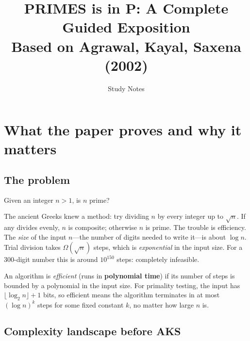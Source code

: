 \documentclass[12pt]{article}
\title{\textbf{PRIMES is in P: A Complete Guided Exposition}\\
  \large Based on Agrawal, Kayal, Saxena (2002)}
\author{Study Notes}
\date{}
\begin{document}
\maketitle
\tableofcontents
\newpage

\section{What the paper proves and why it matters}

\subsection{The problem}

Given an integer $n > 1$, is $n$ prime?

The ancient Greeks knew a method: try dividing $n$ by every integer up to $\sqrt{n}$. If any divides evenly, $n$ is composite; otherwise $n$ is prime. The trouble is efficiency. The \emph{size} of the input $n$---the number of digits needed to write it---is about $\log n$. Trial division takes $\Omega(\sqrt{n})$ steps, which is \emph{exponential} in the input size. For a 300-digit number this is around $10^{150}$ steps: completely infeasible.

\begin{defbox}
An algorithm is \emph{efficient} (runs in \textbf{polynomial time}) if its number of steps is bounded by a polynomial in the input size. For primality testing, the input has $\lfloor\log_2 n\rfloor + 1$ bits, so efficient means the algorithm terminates in at most $(\log n)^k$ steps for some fixed constant $k$, no matter how large $n$ is.
\end{defbox}

\subsection{Complexity landscape before AKS}
\end{document}
